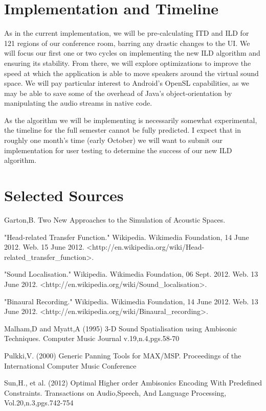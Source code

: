 \documentclass[12pt, letterpaper, draft]{article}
\begin{document}
\section*{Implementation and Timeline}

As in the current implementation, we will be pre-calculating ITD and
ILD for 121 regions of our conference room, barring any drastic
changes to the UI. We will focus our first one or two cycles on
implementing the new ILD algorithm and ensuring its stability. From
there, we will explore optimizations to improve the speed at which the
application is able to move speakers around the virtual sound space.
We will pay particular interest to Android's OpenSL capabilities, as
we may be able to save some of the overhead of Java's
object-orientation by manipulating the audio streams in native code.

As the algorithm we will be implementing is necessarily somewhat
experimental, the timeline for the full semester cannot be fully
predicted. I expect that in roughly one month's time (early October)
we will want to submit our implementation for user testing to
determine the success of our new ILD algorithm.

\section*{Selected Sources}
Garton,B. Two New Approaches to the Simulation of Acoustic Spaces.

"Head-related Transfer Function." Wikipedia. Wikimedia Foundation, 14 June 2012. Web. 15 June 2012. <http://en.wikipedia.org/wiki/Head-related\_transfer\_function>.

"Sound Localisation." Wikipedia. Wikimedia Foundation, 06 Sept. 2012. Web. 13 June 2012. <http://en.wikipedia.org/wiki/Sound\_localisation>.

"Binaural Recording." Wikipedia. Wikimedia Foundation, 14 June 2012. Web. 13 June 2012. <http://en.wikipedia.org/wiki/Binaural\_recording>.

Malham,D and  Myatt,A (1995) 3-D Sound Spatialisation using Ambisonic Techniques. Computer Music Journal v.19,n.4,pgs.58-70

Pulkki,V. (2000) Generic Panning Tools for MAX/MSP. Proceedings of the  International Computer Music Conference

Sun,H., et al. (2012) Optimal Higher order Ambisonics Encoding With Predefined Constraints. Transactions on Audio,Speech, And Language Processing, Vol.20,n.3,pgs.742-754
\end{document}
